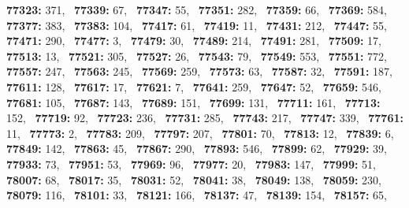 \textbf{77323:} 371,\allowbreak~ 
\textbf{77339:} 67,\allowbreak~ 
\textbf{77347:} 55,\allowbreak~ 
\textbf{77351:} 282,\allowbreak~ 
\textbf{77359:} 66,\allowbreak~ 
\textbf{77369:} 584,\allowbreak~ 
\textbf{77377:} 383,\allowbreak~ 
\textbf{77383:} 104,\allowbreak~ 
\textbf{77417:} 61,\allowbreak~ 
\textbf{77419:} 11,\allowbreak~ 
\textbf{77431:} 212,\allowbreak~ 
\textbf{77447:} 55,\allowbreak~ 
\textbf{77471:} 290,\allowbreak~ 
\textbf{77477:} 3,\allowbreak~ 
\textbf{77479:} 30,\allowbreak~ 
\textbf{77489:} 214,\allowbreak~ 
\textbf{77491:} 281,\allowbreak~ 
\textbf{77509:} 17,\allowbreak~ 
\textbf{77513:} 13,\allowbreak~ 
\textbf{77521:} 305,\allowbreak~ 
\textbf{77527:} 26,\allowbreak~ 
\textbf{77543:} 79,\allowbreak~ 
\textbf{77549:} 553,\allowbreak~ 
\textbf{77551:} 772,\allowbreak~ 
\textbf{77557:} 247,\allowbreak~ 
\textbf{77563:} 245,\allowbreak~ 
\textbf{77569:} 259,\allowbreak~ 
\textbf{77573:} 63,\allowbreak~ 
\textbf{77587:} 32,\allowbreak~ 
\textbf{77591:} 187,\allowbreak~ 
\textbf{77611:} 128,\allowbreak~ 
\textbf{77617:} 17,\allowbreak~ 
\textbf{77621:} 7,\allowbreak~ 
\textbf{77641:} 259,\allowbreak~ 
\textbf{77647:} 52,\allowbreak~ 
\textbf{77659:} 546,\allowbreak~ 
\textbf{77681:} 105,\allowbreak~ 
\textbf{77687:} 143,\allowbreak~ 
\textbf{77689:} 151,\allowbreak~ 
\textbf{77699:} 131,\allowbreak~ 
\textbf{77711:} 161,\allowbreak~ 
\textbf{77713:} 152,\allowbreak~ 
\textbf{77719:} 92,\allowbreak~ 
\textbf{77723:} 236,\allowbreak~ 
\textbf{77731:} 285,\allowbreak~ 
\textbf{77743:} 217,\allowbreak~ 
\textbf{77747:} 339,\allowbreak~ 
\textbf{77761:} 11,\allowbreak~ 
\textbf{77773:} 2,\allowbreak~ 
\textbf{77783:} 209,\allowbreak~ 
\textbf{77797:} 207,\allowbreak~ 
\textbf{77801:} 70,\allowbreak~ 
\textbf{77813:} 12,\allowbreak~ 
\textbf{77839:} 6,\allowbreak~ 
\textbf{77849:} 142,\allowbreak~ 
\textbf{77863:} 45,\allowbreak~ 
\textbf{77867:} 290,\allowbreak~ 
\textbf{77893:} 546,\allowbreak~ 
\textbf{77899:} 62,\allowbreak~ 
\textbf{77929:} 39,\allowbreak~ 
\textbf{77933:} 73,\allowbreak~ 
\textbf{77951:} 53,\allowbreak~ 
\textbf{77969:} 96,\allowbreak~ 
\textbf{77977:} 20,\allowbreak~ 
\textbf{77983:} 147,\allowbreak~ 
\textbf{77999:} 51,\allowbreak~ 
\textbf{78007:} 68,\allowbreak~ 
\textbf{78017:} 35,\allowbreak~ 
\textbf{78031:} 52,\allowbreak~ 
\textbf{78041:} 38,\allowbreak~ 
\textbf{78049:} 138,\allowbreak~ 
\textbf{78059:} 230,\allowbreak~ 
\textbf{78079:} 116,\allowbreak~ 
\textbf{78101:} 33,\allowbreak~ 
\textbf{78121:} 166,\allowbreak~ 
\textbf{78137:} 47,\allowbreak~ 
\textbf{78139:} 154,\allowbreak~ 
\textbf{78157:} 65,\allowbreak~ 
